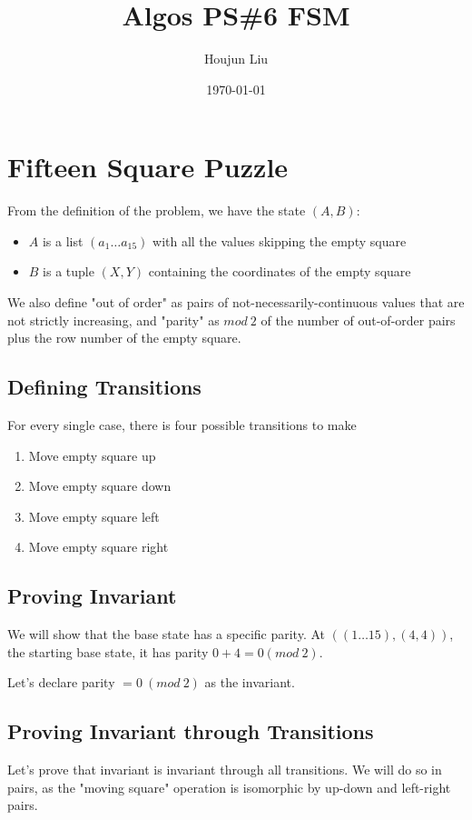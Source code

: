 \documentclass[letterpaper]{article}
\author{Houjun Liu}
\date{\today}
\title{Algos PS\#6 FSM}
\renewcommand{\tableofcontents}{}
\renewcommand\maketitle{}
\begin{document}
\maketitle
\tableofcontents


\section{Fifteen Square Puzzle}
\label{sec:org20d3b34}
From the definition of the problem, we have the state \((A,B)\):

\begin{itemize}
\item \(A\) is a list \((a_1\ldots a_{15})\) with all the values skipping the empty square
\item \(B\) is a tuple \((X,Y)\) containing the coordinates of the empty square
\end{itemize}

We also define "out of order" as pairs of not-necessarily-continuous values that are not strictly increasing, and "parity" as \(mod\ 2\) of the number of out-of-order pairs plus the row number of the empty square.

\subsection{Defining Transitions}
\label{sec:org017434c}
For every single case, there is four possible transitions to make

\begin{enumerate}
\item Move empty square up
\item Move empty square down
\item Move empty square left
\item Move empty square right
\end{enumerate}

\subsection{Proving Invariant}
\label{sec:org59ddb69}
We will show that the base state has a specific parity. At \(((1\ldots 15), (4,4))\), the starting base state, it has parity \(0 + 4 = 0 (mod\ 2)\).

Let's declare parity \(=0\ (mod\ 2)\) as the invariant.

\subsection{Proving Invariant through Transitions}
\label{sec:org238ccd9}
Let's prove that invariant is invariant through all transitions. We will do so in pairs, as the "moving square" operation is isomorphic by up-down and left-right pairs.
\end{document}
